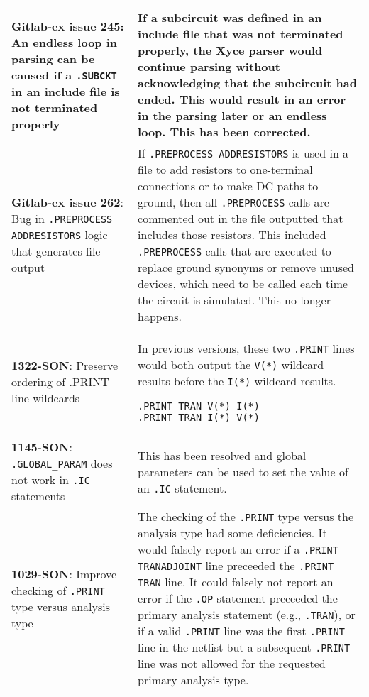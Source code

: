 {\begin{longtable}[h] {>{\raggedright\small}m{2in}|>{\raggedright\let\\\tabularnewline\small}m{3.5in}}
  \textbf{Gitlab-ex issue 245}: An endless loop in parsing can be caused 
if a \texttt{.SUBCKT} in an include file is not terminated properly &
If a subcircuit was defined in an include file that was not terminated
properly, the Xyce parser would continue parsing without acknowledging
that the subcircuit had ended.  This would result in an error in the
parsing later or an endless loop.  This has been corrected. \\ \hline
 
  \textbf{Gitlab-ex issue 262}: Bug in \texttt{.PREPROCESS ADDRESISTORS} 
logic that generates file output & If \texttt{.PREPROCESS ADDRESISTORS}
is used in a file to add resistors to one-terminal connections or to
make DC paths to ground, then all \texttt{.PREPROCESS} calls are 
commented out in the file outputted that includes those resistors.
This included \texttt{.PREPROCESS} calls that are executed to replace
ground synonyms or remove unused devices, which need to be called each
time the circuit is simulated.  This no longer happens. \\ \hline

  \textbf{1322-SON}: Preserve ordering of .PRINT line wildcards &
In previous \Xyce{} versions, these two \texttt{.PRINT} lines would
both output the \texttt{V(*)} wildcard results before the \texttt{I(*)}
wildcard results.
\begin{verbatim}
.PRINT TRAN V(*) I(*)
.PRINT TRAN I(*) V(*)
\end{verbatim}
\\ \hline

  \textbf{1145-SON}: \texttt{.GLOBAL\_PARAM} does not work
in \texttt{.IC} statements & This has been resolved and global
parameters can be used to set the value of an \texttt{.IC}
statement.\\ \hline

  \textbf{1029-SON}: Improve checking of \texttt{.PRINT} type versus
analysis type & The checking of the \texttt{.PRINT} type versus the
analysis type had some deficiencies. It would falsely report an error
if a \texttt{.PRINT TRANADJOINT} line preceeded the \texttt{.PRINT
TRAN} line.  It could falsely not report an error if the \texttt{.OP}
statement preceeded the primary analysis statement (e.g.,
\texttt{.TRAN}), or if a valid \texttt{.PRINT} line was the first \texttt{.PRINT}
line in the netlist but a subsequent \texttt{.PRINT} line was not allowed
for the requested primary analysis type. \\ \hline

\end{longtable}
}

